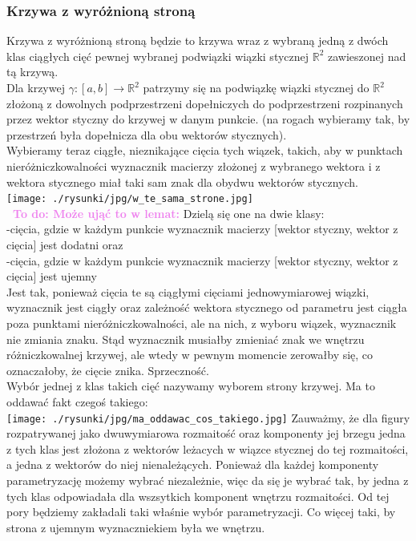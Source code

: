 \documentclass[a4paper, 12pt]{article}
\newcommand{\smalltodoII}[1]{\hfill \break \textbf{\ \textcolor{violet}{To do: #1}}\hfill \break}
\newcommand{\rysunek}[1]{\hfill \break\\[16pt] \Huge \textbf{\textcolor{violet}{Brakujący rysunek \normalsize
#1}} \hfill
\break \\[16pt] \normalsize}
\begin{document}
\subsubsection{Krzywa z wyróżnioną stroną}
Krzywa z wyróżnioną stroną będzie to krzywa wraz z wybraną jedną z dwóch klas ciągłych cięć pewnej wybranej
 podwiązki wiązki stycznej $\mathbb{R}^2$ zawieszonej nad tą krzywą. \\
Dla krzywej $\gamma : [a, b] \to \mathbb{R}^2$ patrzymy się na podwiązkę wiązki stycznej do
$\mathbb{R}^2$ złożoną
z dowolnych podprzestrzeni dopełniczych do podprzestrzeni rozpinanych przez wektor styczny do krzywej w
danym punkcie. (na rogach wybieramy tak, by przestrzeń była dopełnicza dla obu wektorów stycznych). \\
Wybieramy teraz ciągłe, nieznikające cięcia tych wiązek, takich, aby w punktach nieróżniczkowalności
wyznacznik macierzy złożonej z wybranego wektora i z wektora stycznego miał taki sam znak dla obydwu
wektorów stycznych. \\
\texttt{[image: ./rysunki/jpg/w\_te\_sama\_strone.jpg]} \\
\smalltodoII{Może ująć to w lemat:}
Dzielą się one na dwie klasy: \\
-cięcia, gdzie w każdym punkcie wyznacznik macierzy [wektor styczny, wektor z cięcia] jest dodatni oraz\\
-cięcia, gdzie w każdym punkcie wyznacznik macierzy [wektor styczny, wektor z cięcia] jest ujemny \\
Jest tak, ponieważ cięcia te są ciągłymi cięciami jednowymiarowej wiązki, wyznacznik jest ciągły oraz
zależność wektora stycznego od parametru jest ciągła poza punktami nieróżniczkowalności, ale na nich,
z wyboru wiązek, wyznacznik nie zmiania znaku. Stąd wyznacznik musiałby zmieniać znak we wnętrzu
różniczkowalnej krzywej, ale wtedy w pewnym momencie zerowałby się, co oznaczałoby, że cięcie znika.
Sprzeczność. \\
Wybór jednej z klas takich cięć nazywamy wyborem strony krzywej. Ma to oddawać fakt czegoś takiego: \\
\texttt{[image: ./rysunki/jpg/ma\_oddawac\_cos\_takiego.jpg]}
Zauważmy, że dla figury rozpatrywanej jako dwuwymiarowa rozmaitość oraz komponenty jej brzegu jedna z tych
klas jest złożona z wektorów leżacych w wiązce stycznej do tej rozmaitości, a jedna z wektorów do niej
nienależących. Ponieważ dla każdej komponenty parametryzację możemy wybrać niezależnie, więc da się je wybrać
tak, by jedna z tych klas odpowiadała dla wszsytkich komponent wnętrzu rozmaitości. Od tej pory będziemy
zakładali taki właśnie wybór parametryzacji. Co więcej taki, by strona z ujemnym wyznaczniekiem była we
wnętrzu.
\\
\end{document}
